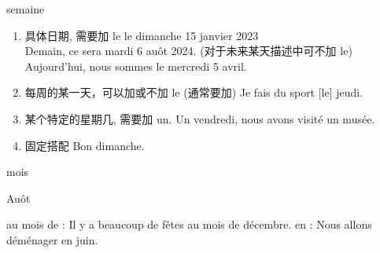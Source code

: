 \documentclass[../templates/main.tex]{subfiles}
\begin{document}
\begin{grammar}{semaine}
	\begin{french}
		   
		  
	\end{french}
	\begin{enumerate}
		\item 具体日期, 需要加 le
		      le dimanche 15 janvier 2023\\
		      Demain, ce sera mardi 6 auôt 2024. (对于未来某天描述中可不加 le)
		      Aujourd'hui, nous sommes le mercredi 5 avril.
		\item 每周的某一天，可以加或不加 le (通常要加)
		      Je fais du sport [le] jeudi.
		\item 某个特定的星期几, 需要加 un.
		      Un vendredi, nous avons visité un musée.
		\item 固定搭配
		      Bon dimanche.
	\end{enumerate}
\end{grammar}
\begin{grammar}{mois}
	\begin{french}
		  
		  
		 Auôt  
		 
	\end{french}
	au mois de : Il y a beaucoup de fêtes au mois de décembre.
	en : Nous allons déménager en juin.
\end{grammar}
\end{document}

